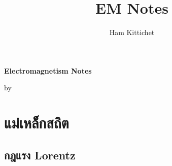 \documentclass[11pt,oneside]{book}
\title{EM Notes}
\author{Ham Kittichet}
\begin{document}
\frontmatter

\begin{titlepage}
\vspace*{\fill}
\begin{center}
    \Huge{\sffamily\bfseries Electromagnetism Notes}
    
    \LARGE{\sffamily by \theauthor}
    
    \vspace{250pt}
    
    \Large{\sffamily\thedate}
\end{center}
\vspace*{\fill}
\end{titlepage}

\tableofcontents

\mainmatter





\chapter{แม่เหล็กสถิต}
\section{กฎแรง Lorentz}
\end{document}
